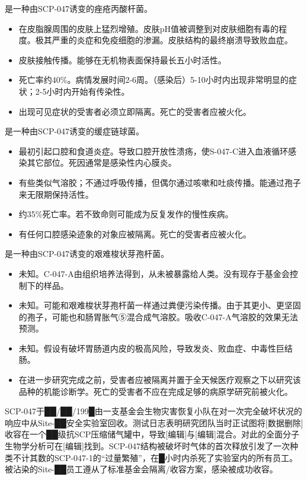 是一种由SCP-047诱变的痤疮丙酸杆菌。



\begin{itemize}
\item {}在皮脂腺周围的皮肤上猛烈增殖。皮肤pH值被调整到对皮肤细胞有毒的程度。极其严重的炎症和免疫细胞的渗漏。皮肤结构的最终崩溃导致败血症。
\item {}皮肤接触传播。能够在无机物表面保持最长五小时活性。
\item {}死亡率约40\%。病情发展时间2-6周。（感染后）5-10小时内出现非常明显的症状；2-5小时内开始有传染性。
\item {}出现可见症状的受害者必须立即隔离。死亡的受害者应被火化。
\end{itemize}

是一种由SCP-047诱变的缓症链球菌。



\begin{itemize}
\item {}最初引起口腔和食道炎症。导致口腔开放性溃疡，使S-047-C进入血液循环感染其它部位。死因通常是感染性内心膜炎。
\item {}有些类似气溶胶；不通过呼吸传播，但偶尔通过咳嗽和吐痰传播。能通过孢子来无限期保持活性。
\item {}约35\%死亡率。若不致命则可能成为反复发作的慢性疾病。
\item {}有任何口腔感染迹象的对象应被隔离。死亡的受害者应被火化。
\end{itemize}

是一种由SCP-047诱变的艰难梭状芽孢杆菌。



\begin{itemize}
\item {}未知。C-047-A由组织培养法得到，从未被暴露给人类。没有现存于基金会控制下的样品。
\item {}未知。可能和艰难梭状芽孢杆菌一样通过粪便污染传播。由于其更小、更坚固的孢子，可能也和肠胃胀气⑤混合成气溶胶。吸收C-047-A气溶胶的效果无法预测。
\item {}未知。假设有破坏胃肠道内皮的极高风险，导致发炎、败血症、中毒性巨结肠。
\item {}在进一步研究完成之前，受害者应被隔离并置于全天候医疗观察之下以研究该品种的机能诊断学。死亡的受害者不应在完成足够的病原学研究前被火化。
\end{itemize}

SCP-047于██\slash ██\slash 199█由一支基金会生物灾害恢复小队在对一次完全破坏状况的响应中从Site-██安全实验室回收。测试日志表明研究团队当时正试图将{[}数据删除]收容在一个██级抗SCP压缩储气罐中，导致{[}编辑]与{[}编辑]混合。对此的全面分子生物学分析可在{[}编辑]找到。SCP-047结构被破坏时气体的首次释放引发了一次种类不计其数的SCP-047-1的“过量繁殖”，在█小时内杀死了实验室内的所有员工。被沾染的Site-██员工遵从了标准基金会隔离\slash 收容方案，感染被成功收容。
